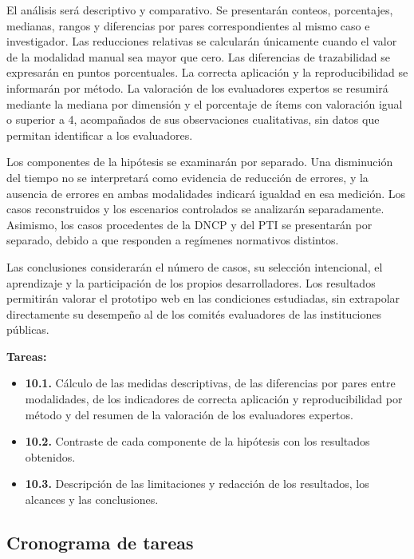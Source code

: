 \documentclass[12pt,a4paper]{article}
\begin{document}
El análisis será descriptivo y comparativo. Se presentarán conteos, porcentajes, medianas, rangos y diferencias por pares correspondientes al mismo caso e investigador. Las reducciones relativas se calcularán únicamente cuando el valor de la modalidad manual sea mayor que cero. Las diferencias de trazabilidad se expresarán en puntos porcentuales. La correcta aplicación y la reproducibilidad se informarán por método. La valoración de los evaluadores expertos se resumirá mediante la mediana por dimensión y el porcentaje de ítems con valoración igual o superior a 4, acompañados de sus observaciones cualitativas, sin datos que permitan identificar a los evaluadores.

Los componentes de la hipótesis se examinarán por separado. Una disminución del tiempo no se interpretará como evidencia de reducción de errores, y la ausencia de errores en ambas modalidades indicará igualdad en esa medición. Los casos reconstruidos y los escenarios controlados se analizarán separadamente. Asimismo, los casos procedentes de la DNCP y del PTI se presentarán por separado, debido a que responden a regímenes normativos distintos.

Las conclusiones considerarán el número de casos, su selección intencional, el aprendizaje y la participación de los propios desarrolladores. Los resultados permitirán valorar el prototipo web en las condiciones estudiadas, sin extrapolar directamente su desempeño al de los comités evaluadores de las instituciones públicas.

\textbf{Tareas:}

\begin{itemize}
\item \textbf{10.1.} Cálculo de las medidas descriptivas, de las diferencias por pares entre modalidades, de los indicadores de correcta aplicación y reproducibilidad por método y del resumen de la valoración de los evaluadores expertos.
\item \textbf{10.2.} Contraste de cada componente de la hipótesis con los resultados obtenidos.
\item \textbf{10.3.} Descripción de las limitaciones y redacción de los resultados, los alcances y las conclusiones.
\end{itemize}

\subsection{Cronograma de tareas}
\end{document}
